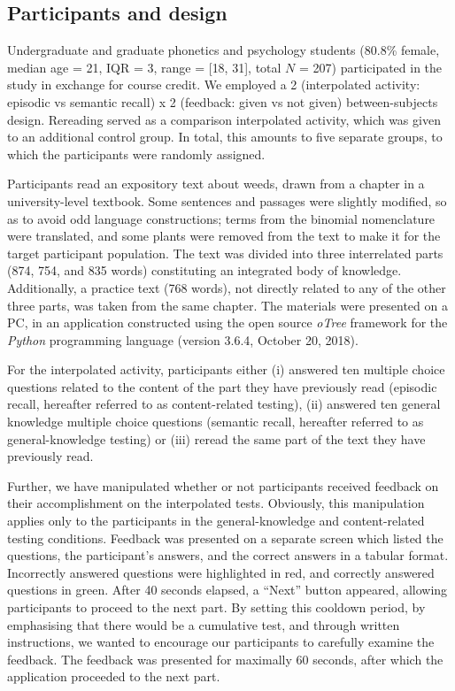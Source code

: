\documentclass[../main.tex]{subfiles}
\begin{document}
\hypertarget{participants-and-design}{%
\subsection{Participants and design}\label{participants-and-design}}

Undergraduate and graduate phonetics and psychology students (80.8\%
female, median age = 21, IQR = 3, range = {[}18, 31{]}, total \(N\) =
207) participated in the study in exchange for course credit. We
employed a 2 (interpolated activity: episodic vs semantic recall) x 2
(feedback: given vs not given) between-subjects design. Rereading served
as a comparison interpolated activity, which was given to an additional 
control group. In total, this amounts to five separate groups, to which 
the participants were randomly assigned.

Participants read an expository text about weeds, drawn from a chapter
in a university-level textbook. Some sentences and passages were
slightly modified, so as to avoid odd language constructions; terms from
the binomial nomenclature were translated, and some plants were removed
from the text to make it for the target participant
population. The text was divided into three interrelated parts (874,
754, and 835 words) constituting an integrated body of knowledge.
Additionally, a practice text (768 words), not directly related to any
of the other three parts, was taken from the same chapter. The materials
were presented on a PC, in an application constructed using the open
source \textit{oTree} framework
\citep[version 2.1.35,][]{chenOTreeOpensourcePlatform2016} for the
\textit{Python} programming language (version 3.6.4, October 20, 2018).

For the interpolated activity, participants either (i) answered ten
multiple choice questions related to the content of the part they have
previously read (episodic recall, hereafter referred to as
content-related testing), (ii) answered ten general knowledge multiple
choice questions (semantic recall, hereafter referred to as
general-knowledge testing) or (iii) reread the same part of the text
they have previously read.

Further, we have manipulated whether or not participants received
feedback on their accomplishment on the interpolated tests. Obviously,
this manipulation applies only to the participants in the
general-knowledge and content-related testing conditions. Feedback was
presented on a separate screen which listed the questions, the
participant's answers, and the correct answers in a tabular format.
Incorrectly answered questions were highlighted in red, and correctly
answered questions in green. After 40 seconds elapsed, a ``Next'' button
appeared, allowing participants to proceed to the next part. By setting
this cooldown period, by emphasising that there would be a cumulative
test, and through written instructions, we wanted to encourage our
participants to carefully examine the feedback. The feedback was
presented for maximally 60 seconds, after which the application
proceeded to the next part.
\end{document}
